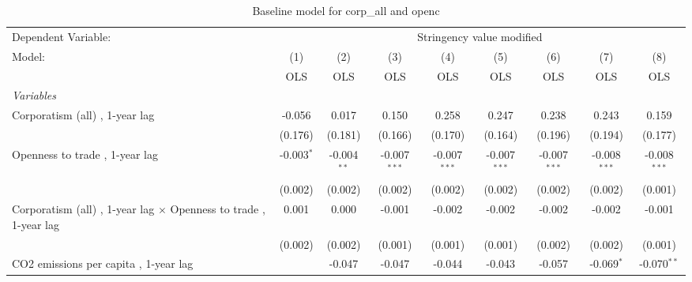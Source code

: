 
\begin{table}[htbp]
   \caption{Baseline model for corp\_all and openc}
   \centering
   \begin{tabular}{lcccccccc}
      \toprule
      Dependent Variable: & \multicolumn{8}{c}{Stringency value modified}\\
      Model:                                                                  & (1)          & (2)           & (3)            & (4)            & (5)            & (6)            & (7)            & (8)\\  
                                                                              &  OLS         & OLS           & OLS            & OLS            & OLS            & OLS            & OLS            & OLS\\  
      \midrule
      \emph{Variables}\\
      Corporatism (all) , 1-year lag                                          & -0.056       & 0.017         & 0.150          & 0.258          & 0.247          & 0.238          & 0.243          & 0.159\\   
                                                                              & (0.176)      & (0.181)       & (0.166)        & (0.170)        & (0.164)        & (0.196)        & (0.194)        & (0.177)\\   
      Openness to trade , 1-year lag                                          & -0.003$^{*}$ & -0.004$^{**}$ & -0.007$^{***}$ & -0.007$^{***}$ & -0.007$^{***}$ & -0.007$^{***}$ & -0.008$^{***}$ & -0.008$^{***}$\\   
                                                                              & (0.002)      & (0.002)       & (0.002)        & (0.002)        & (0.002)        & (0.002)        & (0.002)        & (0.001)\\   
      Corporatism (all) , 1-year lag $\times$ Openness to trade , 1-year lag  & 0.001        & 0.000         & -0.001         & -0.002         & -0.002         & -0.002         & -0.002         & -0.001\\   
                                                                              & (0.002)      & (0.002)       & (0.001)        & (0.001)        & (0.001)        & (0.002)        & (0.002)        & (0.001)\\   
      CO2 emissions per capita , 1-year lag                                   &              & -0.047        & -0.047         & -0.044         & -0.043         & -0.057         & -0.069$^{*}$   & -0.070$^{**}$\\   

\end{tabular}
\end{table}
